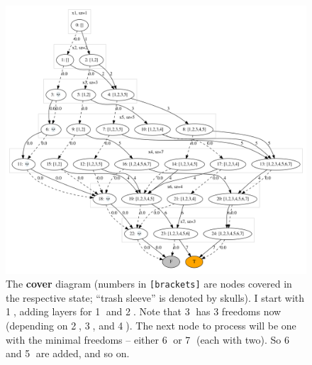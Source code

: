 \documentclass[11pt]{article}
\begin{document}
\begin{figure}[htbp]
\centering
\includegraphics[width=530px]{./cover.png}
\caption{\label{fig:cover}The \textbf{cover} diagram (numbers in \texttt{[brackets]} are nodes covered in the respective state; ``trash sleeve'' is denoted by skulls). I start with \textcircled{1}, adding layers for \textcircled{1} and \textcircled{2}. Note that \textcircled{3} has 3 freedoms now (depending on \textcircled{2}, \textcircled{3}, and \textcircled{4}). The next node to process will be one with the minimal freedoms -- either \textcircled{6} or \textcircled{7} (each with two). So \textcircled{6} and \textcircled{5} are added, and so on.}
\end{figure}
\end{document}
